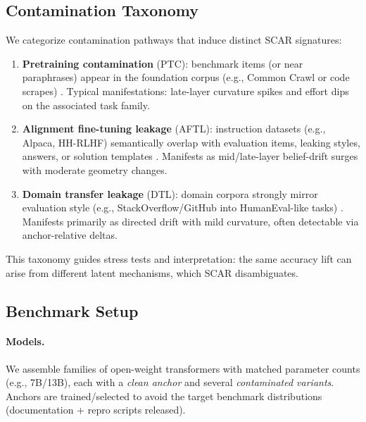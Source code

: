 \documentclass[11pt]{article}
\begin{document}
\subsection*{Contamination Taxonomy}
\label{subsec:taxonomy}
We categorize contamination pathways that induce distinct SCAR signatures:
\begin{enumerate}
    \item \textbf{Pretraining contamination} (PTC): benchmark items (or near paraphrases) appear in the foundation corpus (e.g., Common Crawl or code scrapes) \citep{dodge2021documenting,gao2020pile}. Typical manifestations: late-layer curvature spikes and effort dips on the associated task family.
    \item \textbf{Alignment fine-tuning leakage} (AFTL): instruction datasets (e.g., Alpaca, HH-RLHF) semantically overlap with evaluation items, leaking styles, answers, or solution templates \citep{bai2022harmless,ouyang2022instructgpt,wang2023selfinstruct}. Manifests as mid/late-layer belief-drift surges with moderate geometry changes.
    \item \textbf{Domain transfer leakage} (DTL): domain corpora strongly mirror evaluation style (e.g., StackOverflow/GitHub into HumanEval-like tasks) \citep{chen2021humaneval}. Manifests primarily as directed drift with mild curvature, often detectable via anchor-relative deltas.
\end{enumerate}
This taxonomy guides stress tests and interpretation: the same accuracy lift can arise from different latent mechanisms, which SCAR disambiguates.

\subsection*{Benchmark Setup}
\label{subsec:setup}
\paragraph{Models.} We assemble families of open-weight transformers with matched parameter counts (e.g., 7B/13B), each with a \emph{clean anchor} and several \emph{contaminated variants}. Anchors are trained/selected to avoid the target benchmark distributions (documentation + repro scripts released).
\end{document}
